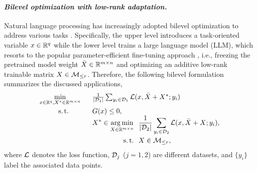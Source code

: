 \paragraph{\emph{\textbf{Bilevel optimization with low-rank adaptation.}}} Natural language processing has increasingly adopted bilevel optimization to address various tasks \cite{grangier2023LLMshift,shen2025seal,zangrando2025debora}. Specifically, the upper level introduces a task-oriented variable $x\in\mathbb{R}^q$ while the lower level trains a large language model (LLM), which resorts to the popular parameter-efficient fine-tuning approach \cite{hu2022lora}, i.e., freezing the pretrained model weight $\bar{X}\in\mathbb{R}^{m\times n}$ and optimizing an additive low-rank trainable matrix $X\in\mathcal{M}_{\le r}$. Therefore, the following bilevel formulation summarizes the discussed applications,
\begin{equation*}
\begin{array}{cl}
         \min\limits_{x\in\mbR^q, X^*\in\mbRmn}\ & \ \frac{1}{\left|\mathcal{D}_1\right|} \sum_{y_i \in \mathcal{D}_{1}} \lanifold(x,\bar{X}+X^*;y_i) 
         \\[3mm]
         \mathrm{s.\,t.}\!\!\!\!&\ G(x)\le 0,
         \\
         &\ 
        \begin{aligned}[t]
            X^* \in \argmin_{X\in\mbRmn}&\ \ \frac{1}{\left|\mathcal{D}_{2}\right|} \sum_{y_i \in \mathcal{D}_{2}} \lanifold(x, \bar{X}+X; y_i),
            \\
            \st&\ \ X\in\boundedrank,
        \end{aligned}
\end{array}
\end{equation*}
where $\mathcal{L}$ denotes the loss function, $\mathcal{D}_j$ ($j=1,2$) are different datasets, and $\{y_i\}$ label the associated data points. 

